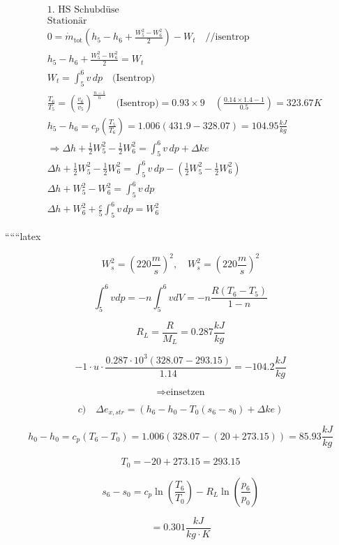 \begin{align*}
    &\text{1. HS Schubdüse} \\
    &\text{Stationär} \\
    &0 = \dot{m}_{\text{tot}} \left( h_5 - h_6 + \frac{W_5^2 - W_6^2}{2} \right) - W_t \quad \text{//isentrop} \\
    &h_5 - h_6 + \frac{W_5^2 - W_6^2}{2} = W_t \\
    &W_t = \int_{5}^{6} v \, dp \quad \text{(Isentrop)} \\
    &\frac{T_6}{T_5} = \left( \frac{v_6}{v_5} \right)^{\frac{n-1}{n}} \quad \text{(Isentrop)} = 0.93 \times 9 \quad \left( \frac{0.14 \times 1.4 - 1}{0.5} \right) = 323.67K \\
    &h_5 - h_6 = c_p \left( \frac{T_5}{T_6} \right) = 1.006 \left( 431.9 - 328.07 \right) = 104.95 \frac{kJ}{kg} \\
    &\Rightarrow \Delta h + \frac{1}{2} W_5^2 - \frac{1}{2} W_6^2 = \int_{5}^{6} v \, dp + \Delta ke \\
    &\Delta h + \frac{1}{2} W_5^2 - \frac{1}{2} W_6^2 = \int_{5}^{6} v \, dp - \left( \frac{1}{2} W_5^2 - \frac{1}{2} W_6^2 \right) \\
    &\Delta h + W_5^2 - W_6^2 = \int_{5}^{6} v \, dp \\
    &\Delta h + W_6^2 + \frac{c}{5} \int_{5}^{6} v \, dp = W_6^2
\end{align*}

``````latex


\[
W_s^2 = (220 \frac{m}{s})^2, \quad W_s^2 = (220 \frac{m}{s})^2
\]

\[
\int_{5}^{6} v dp = -n \int_{5}^{6} v dV = -n \frac{R (T_6 - T_5)}{1 - n}
\]

\[
R_L = \frac{R}{M_L} = 0.287 \frac{kJ}{kg}
\]

\[
-1 \cdot u \cdot \frac{0.287 \cdot 10^3 (328.07 - 293.15)}{1.14} = -104.2 \frac{kJ}{kg}
\]

\[
\Rightarrow \text{einsetzen}
\]

\[
c) \quad \Delta e_{x,str} = \boxed{(h_6 - h_0 - T_0 (s_6 - s_0) + \Delta ke)}
\]

\[
h_0 - h_0 = c_p (T_6 - T_0) = 1.006 (328.07 - (20 + 273.15)) = 85.93 \frac{kJ}{kg}
\]

\[
T_0 = -20 + 273.15 = 293.15
\]

\[
s_6 - s_0 = c_p \ln \left( \frac{T_6}{T_0} \right) - R_L \ln \left( \frac{p_6}{p_0} \right)
\]

\[
= 0.301 \frac{kJ}{kg \cdot K}
\]

